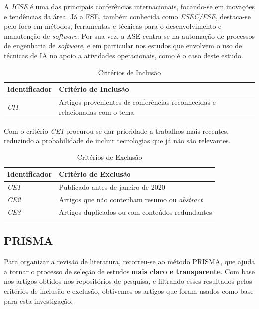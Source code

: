 		A \textit{\gls{ICSE}} é uma das principais conferências internacionais, focando-se em inovações e tendências da área. Já a \gls{FSE}, também conhecida como \textit{ESEC/FSE}, destaca-se pelo foco em métodos, ferramentas e técnicas para o desenvolvimento e manutenção de \textit{software}. Por sua vez, a \gls{ASE} centra-se na automação de processos de engenharia de \textit{software}, e em particular nos estudos que envolvem o uso de técnicas de \gls{IA} no apoio a atividades operacionais, como é o caso deste estudo.
		
		\begin{table}[H]
			\centering
			\begin{tabular}{l p{11cm}}
				\hline
				\textbf{Identificador} & \textbf{Critério de Inclusão} \\
				\hline
				\textit{CI1} & Artigos provenientes de conferências reconhecidas e relacionadas com o tema \\
				\hline
			\end{tabular}
			\caption[Critérios de Inclusão]{Critérios de Inclusão}
			\label{tab:criteriosI}
		\end{table}
		
		Com o critério \textit{CE1} procurou-se dar prioridade a trabalhos mais recentes, reduzindo a probabilidade de incluir tecnologias que já não são relevantes.
		
		\begin{table}[H]
			\centering
			\begin{tabular}{l p{11cm}}
				\hline
				\textbf{Identificador} & \textbf{Critério de Exclusão} \\
				\hline
				\textit{CE1} & Publicado antes de janeiro de 2020 \\
				\textit{CE2} & Artigos que não contenham resumo ou \textit{abstract} \\
				\textit{CE3} & Artigos duplicados ou com conteúdos redundantes \\
				\hline
			\end{tabular}
			\caption[Critérios de Exclusão]{Critérios de Exclusão}
			\label{tab:criteriosE}
		\end{table}
		
	
	\subsection{PRISMA}
		Para organizar a revisão de literatura, recorreu-se ao método \gls{PRISMA}, que ajuda a tornar o processo de seleção de estudos \textbf{mais claro e transparente}. Com base nos artigos obtidos nos repositórios de pesquisa, e filtrando esses resultados pelos critérios de inclusão e exclusão, obtivemos os artigos que foram usados como base para esta investigação.
		
